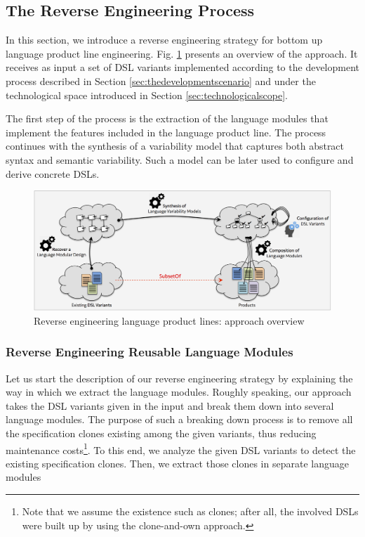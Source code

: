 \subsection{The Reverse Engineering Process}
\label{sec:reverse-engineering}

In this section, we introduce a reverse engineering strategy for bottom up language product line engineering. Fig. \ref{fig:reverse-engineering} presents an overview of the approach. It receives as input a set of DSL variants implemented according to the development process described in Section \ref{sec:thedevelopmentscenario} and under the technological space introduced in Section \ref{sec:technologicalscope}.

The first step of the process is the extraction of the language modules that implement the features included in the language product line. The process continues with the synthesis of a variability model that captures both abstract syntax and semantic variability. Such a model can be later used to configure and derive concrete DSLs.

\begin{figure}
\centering
\includegraphics[width=0.95\linewidth]{images/reverse-engineering-overview.png}
\caption{Reverse engineering language product lines: approach overview}
\label{fig:reverse-engineering}
\end{figure}

\subsubsection{Reverse Engineering Reusable Language Modules}
\label{sec:reverseengineeringmodules}

Let us start the description of our reverse engineering strategy by explaining the way in which we extract the language modules. Roughly speaking, our approach takes the DSL variants given in the input and break them down into several language modules. The purpose of such a breaking down process is to remove all the specification clones existing among the given variants, thus reducing maintenance costs\footnote{Note that we assume the existence such as clones; after all, the involved DSLs were built up by using the clone-and-own approach.}. To this end, we analyze the given DSL variants to detect the existing specification clones. Then, we extract those clones in separate language modules %

